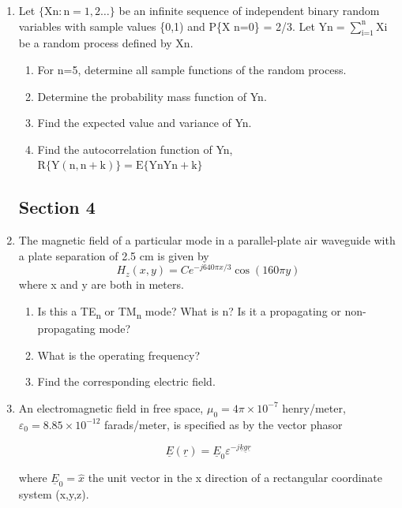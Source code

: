 \documentclass[main.tex]{subfiles}
\begin{document}
\begin{enumerate}
\item Let $\{\mathrm{Xn}: \mathrm{n}=1,2 \ldots\}$ be an infinite sequence of independent binary random variables with sample values \{0,1) and P\{X n=0\} = 2/3. Let $\text{Yn}=\sum_{\text{i=1}}^{\text{n}} \text{Xi}$ be a random process defined by Xn.

    \begin{enumerate}
        \item For n=5, determine all sample functions of the random process.
        \item Determine the probability mass function of Yn.
        \item Find the expected value and variance of Yn.
        \item Find the autocorrelation function of Yn, $\mathrm{R}\{\mathrm{Y}(\mathrm{n}, \mathrm{n}+\mathrm{k})\}=\mathrm{E}\{\mathrm{Yn} \mathrm{Yn}+\mathrm{k}\}$
    \end{enumerate}
    
\subsection{Section 4}

\item The magnetic field of a particular mode in a parallel-plate air waveguide with a plate separation of 2.5 cm is given by
$$H_{z}(x, y)=C e^{-j 640 \pi x / 3} \cos (160 \pi y)$$
where x and y are both in meters.
    
    \begin{enumerate}
        \item Is this a TE\textsubscript{n} or TM\textsubscript{n} mode? What is n? Is it a propagating or non-propagating mode?
        \item What is the operating frequency?
        \item Find the corresponding electric field.
    \end{enumerate}
    
\item An electromagnetic field in free space, $\mu_{0}=4 \pi \times 10^{-7}$ henry/meter, $\varepsilon_0 = 8.85 \times 10^{-12}$ farads/meter, is specified as by the vector phasor 

$$\underline{E}(\underline{r})=\underline{E}_{0} \varepsilon^{-j \underline{k} \underline{g} \underline{r}}$$

where $\underline{E}_{0}=\hat{x}$ the unit vector in the x direction of a rectangular coordinate system (x,y,z).


\end{enumerate}
\end{document}
